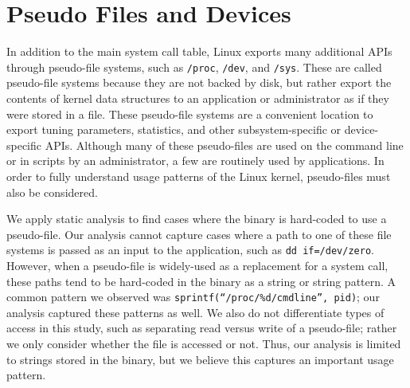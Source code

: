 

\section{Pseudo Files and Devices}
\label{sec:study:files}

In addition to the main system call table, Linux exports many additional APIs through 
pseudo-file systems, such as {\tt /proc}, {\tt /dev}, and {\tt /sys}.
These are called pseudo-file systems because they are not backed by disk, but
rather export the contents of kernel data structures to an application or administrator
as if they were stored in a file.
These pseudo-file systems are a convenient location to export tuning parameters, statistics, 
and other subsystem-specific or device-specific APIs.
Although many of these pseudo-files are used on the command line or in scripts by an administrator,
a few are routinely used by applications.
In order to fully understand usage patterns of the Linux kernel, pseudo-files must also be considered.

We apply static analysis to find cases where the binary is hard-coded to use a pseudo-file.
Our analysis cannot capture cases where a path to one of these file systems is passed as 
an input to the application, such as {\tt dd if=/dev/zero}.
However, when a pseudo-file is widely-used as a replacement for a system call,
these paths tend to be hard-coded in the binary as a string or string pattern.
A common pattern we observed was {\tt sprintf(``/proc/\%d/cmdline'', pid)}; our analysis captured these patterns as well.
We also do not differentiate types of access in this study, such as separating read
versus write of a pseudo-file; rather we only consider whether the file is accessed or not.
Thus, our analysis is limited to strings stored in the binary, but we believe this captures
an important usage pattern.  %


